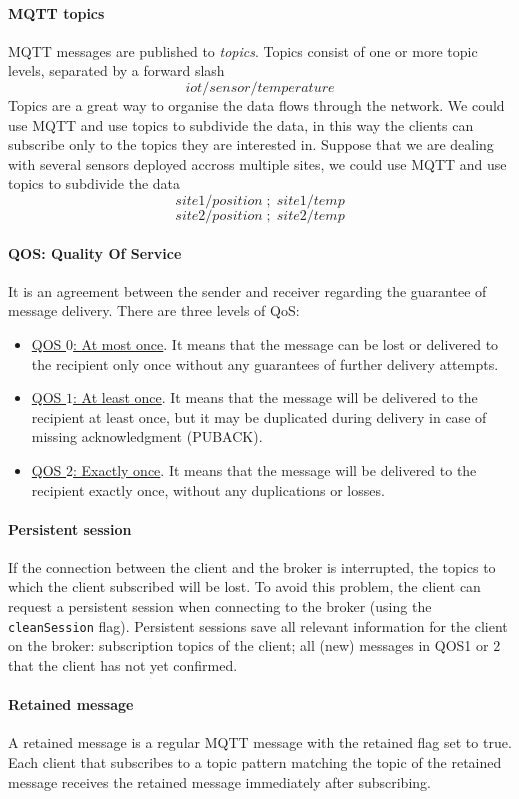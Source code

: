 \paragraph{MQTT topics}
MQTT messages are published to \textit{topics}. Topics consist of one or more topic levels, separated by a forward slash
$$ iot/sensor/temperature $$
Topics are a great way to organise the data flows through the network. We could use MQTT and use topics to subdivide the data, in this way the clients can subscribe only to the topics they are interested in. Suppose that we are dealing with several sensors deployed accross multiple sites, we could use MQTT and use topics to subdivide the data
$$site1/position\;;\;site1/temp$$
$$site2/position\;;\;site2/temp$$

\paragraph{QOS: Quality Of Service}
It is an agreement between the sender and receiver regarding the guarantee of message delivery. There are three levels of QoS:
\begin{itemize}
    \item \uline{QOS $0$: At most once}. It means that the message can be lost or delivered to the recipient only once without any guarantees of further delivery attempts.
    \item \uline{QOS $1$: At least once}. It means that the message will be delivered to the recipient at least once, but it may be duplicated during delivery in case of missing acknowledgment (PUBACK).
    \item \uline{QOS $2$: Exactly once}. It means that the message will be delivered to the recipient exactly once, without any duplications or losses.
\end{itemize}


\paragraph{Persistent session}
If the connection between the client and the broker is interrupted, the topics to which the client subscribed will be lost. To avoid this problem, the client can request a persistent session when connecting to the broker (using the \texttt{cleanSession} flag). Persistent sessions save all relevant information for the client on the broker: subscription topics of the client; all (new) messages in QOS1 or $2$ that the client has not yet confirmed.

\paragraph{Retained message}
A retained message is a regular MQTT message with the retained flag set to true.
Each client that subscribes to a topic pattern matching the topic of the retained message receives the retained message immediately after subscribing.

